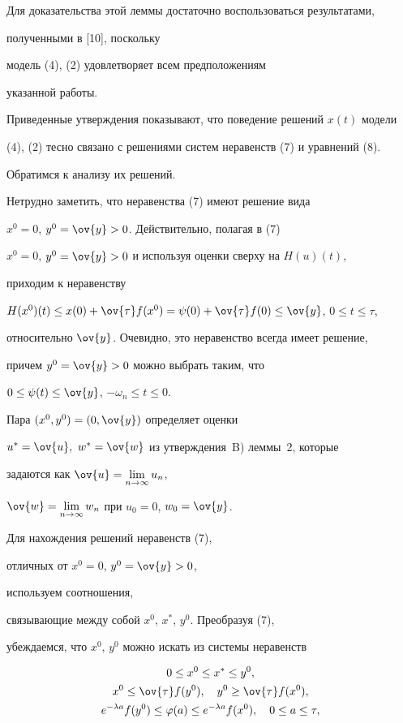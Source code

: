 Для доказательства этой леммы достаточно воспользоваться результатами,


полученными в [10], поскольку


модель (4), (2) удовлетворяет всем предположениям


указанной работы.





Приведенные утверждения показывают, что поведение решений $x(t)$ модели


(4), (2) тесно связано с решениями систем неравенств (7) и уравнений (8).


Обратимся к анализу их решений.


Нетрудно заметить, что неравенства (7) имеют решение вида


$x^{0}=0$, $y^{0}=\ov{y} > 0$. Действительно, полагая в (7)


$x^{0}=0$, $y^{0}=\ov{y} > 0$ и используя оценки сверху на $H(u)(t)$,


приходим к неравенству


$H(x^{0})(t) \leq x(0)+\ov{\tau} f(x^{0})=


\psi(0)+\ov{\tau} f(0) \leq \ov{y}$, $0 \leq t \leq \tau$,


относительно $\ov{y}$. Очевидно, это неравенство всегда имеет решение,


причем $y^{0}=\ov{y} > 0$ можно выбрать таким, что


$0 \leq \psi(t) \leq \ov{y}$, $- \omega_{n} \leq t \leq 0$.


Пара $(x^{0}, y^{0})=(0, \ov{y})$ определяет оценки


$u^{*}=\ov{u}, \ w^{*}=\ov{w}$ из утверждения~B) леммы~2, которые


задаются как $\ov{u}=\lim\limits_{n \to \infty} u_{n}$,


$\ov{w}=\lim\limits_{n \to \infty} w_{n}$ при $u_{0}=0$, $w_{0}=\ov{y}$.





Для нахождения решений неравенств (7),


отличных от $x^{0}=0$, $y^{0}=\ov{y} > 0$,


используем соотношения,


связывающие между собой $x^{0}$, $x^{*}$, $y^{0}$. Преобразуя (7),


убеждаемся, что $x^{0}$, $y^{0}$ можно искать из системы неравенств


\begin{gather}


0 \leq x^{0} \leq x^{*} \leq y^{0}, \\


x^{0} \leq \ov{\tau} f(y^{0}), \quad y^{0} \geq \ov{\tau} f(x^{0}), \\


e^{- \lambda a} f(y^{0}) \leq \varphi(a) \leq e^{- \lambda a} f(x^{0}),


\quad  0 \leq a \leq \tau,


\end{gather}


